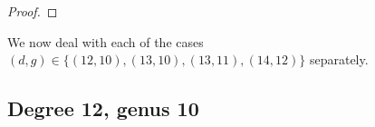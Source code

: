 \documentclass[11pt]{amsart}
\renewcommand{\bar}{\overline}
\newcommand{\isabel}[1]{{\color{purple} ($\spadesuit$ Isabel: #1)}}
\theoremstyle{definition}
\theoremstyle{remark}
\begin{document}
\begin{proof}
%
\end{proof}



We now deal with each of the cases $(d,g) \in \{(12,10), (13,10), (13,11), (14,12) \} $ separately.

\subsection{Degree 12, genus 10}\label{12_10}
\end{document}
